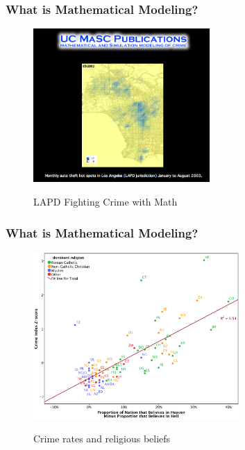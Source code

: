\documentclass[hyperref={colorlinks=false},compress,handout,10pt]{beamer}
\begin{document}
\begin{frame}
    \frametitle{What is Mathematical Modeling?}
    \begin{figure}
        \centering
        \caption{{LAPD Fighting Crime with Math}}
        \href{http://www.youtube.com/watch?v=HZ7fLuO7zb4}{\includegraphics[width=0.6\textwidth]{LAPDUCLA.png}}
        \label{fig:LAPDUCLA}
    \end{figure}
\end{frame}

\begin{frame}[fragile]
    \frametitle{What is Mathematical Modeling?}
        \begin{figure}
            \centering
            \caption{Crime rates and religious beliefs}
            \href{http://www.economist.com/blogs/graphicdetail/2012/09/daily-chart/print}{
            \includegraphics[width=0.7\textwidth]{images/hellvsheaven.png}}
    \end{figure}
\end{frame}
\end{document}
